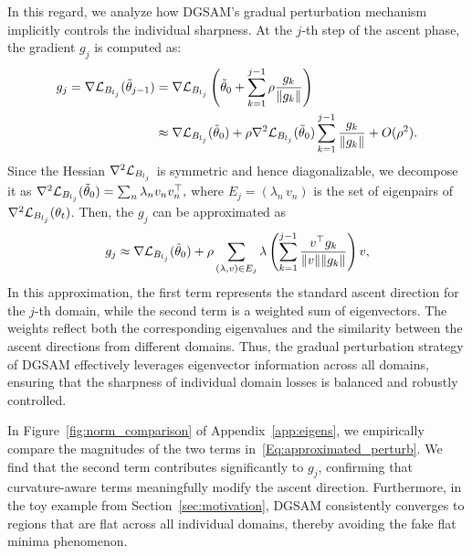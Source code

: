 \documentclass{article}
\theoremstyle{plain}
\theoremstyle{definition}
\theoremstyle{remark}
\begin{document}
In this regard, we analyze how DGSAM’s gradual perturbation mechanism implicitly controls the individual sharpness. At the $j$-th step of the ascent phase, the gradient $g_j$ is computed as:
\begin{align*}
   g_j = \nabla {\mathcal{L}}_{B_{l_j}}(\tilde{\theta}_{j-1})
   &= \nabla{\mathcal{L}}_{B_{l_j}}\left(\tilde{\theta}_0 + \sum\limits_{k=1}^{j-1} \rho \frac{g_k}{\|g_k\|} \right) \\
   &\approx \nabla {\mathcal{L}}_{B_{l_j}}(\tilde{\theta}_0) 
   + \rho \nabla^2 {\mathcal{L}}_{B_{l_j}}(\tilde{\theta}_0) 
     \sum\limits_{k=1}^{j-1} \frac{g_k}{\|g_k\|} + O(\rho^2).
\end{align*}
Since the Hessian $\nabla^2 {\mathcal{L}}_{B_{l_j}}$ is symmetric and hence diagonalizable, we decompose it as \(\nabla^2 {\mathcal{L}}_{B_{l_j}}(\tilde{\theta}_0) = \sum_n \lambda_n v_n v_n^\top,\)
where $E_j = (\lambda_n\,v_n)$ is the set of eigenpairs of $\nabla^2{\mathcal{L}}_{B_{l_j}}(\theta_t)$. Then, the \(g_j\) can be approximated as
\begin{align}
g_j \approx \nabla {\mathcal{L}}_{B_{l_j}}(\tilde{\theta}_0) 
+ \rho \sum_{(\lambda, v) \in E_j} \lambda \left( \sum_{k=1}^{j-1} \frac{v^\top g_k}{\|v\| \|g_k\|} \right) v,
\label{Eq:approximated_perturb}
\end{align}
In this approximation, the first term represents the standard ascent direction for the \(j\)-th domain, while the second term is a weighted sum of eigenvectors. The weights reflect both the corresponding eigenvalues and the similarity between the ascent directions from different domains. Thus, the gradual perturbation strategy of DGSAM effectively leverages eigenvector information across all domains, ensuring that the sharpness of individual domain losses is balanced and robustly controlled.

In Figure~\ref{fig:norm_comparison} of Appendix~\ref{app:eigens}, we empirically compare the magnitudes of the two terms in~\eqref{Eq:approximated_perturb}. We find that the second term contributes significantly to $g_j$, confirming that curvature-aware terms meaningfully modify the ascent direction. Furthermore, in the toy example from Section~\ref{sec:motivation}, DGSAM consistently converges to regions that are flat across all individual domains, thereby avoiding the fake flat minima phenomenon.
\end{document}
